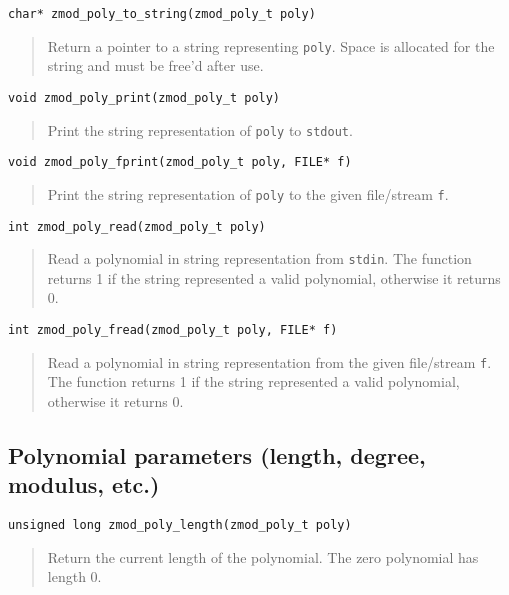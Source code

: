 \documentclass[a4paper,10pt]{article}
\newcommand{\code}{\lstinline}
\begin{document}
\begin{lstlisting}
char* zmod_poly_to_string(zmod_poly_t poly)
\end{lstlisting}
\begin{quote}
Return a pointer to a string representing \code{poly}. Space is allocated for the string and must be free'd after use.
\end{quote}

\begin{lstlisting}
void zmod_poly_print(zmod_poly_t poly)
\end{lstlisting}
\begin{quote}
Print the string representation of \code{poly} to \code{stdout}.
\end{quote}

\begin{lstlisting}
void zmod_poly_fprint(zmod_poly_t poly, FILE* f)
\end{lstlisting}
\begin{quote}
Print the string representation of \code{poly} to the given file/stream \code{f}.
\end{quote}

\begin{lstlisting}
int zmod_poly_read(zmod_poly_t poly)
\end{lstlisting}
\begin{quote}
Read a polynomial in string representation from \code{stdin}. The function returns 1 if the string represented a valid polynomial, otherwise it returns 0.
\end{quote}

\begin{lstlisting}
int zmod_poly_fread(zmod_poly_t poly, FILE* f)
\end{lstlisting}
\begin{quote}
Read a polynomial in string representation from the given file/stream \code{f}. The function returns 1 if the string represented a valid polynomial, otherwise it returns 0.
\end{quote}

\subsection{Polynomial parameters (length, degree, modulus, etc.)}
\begin{lstlisting}
unsigned long zmod_poly_length(zmod_poly_t poly)
\end{lstlisting}
\begin{quote}
Return the current length of the polynomial. The zero polynomial has length 0.
\end{quote}
\end{document}
